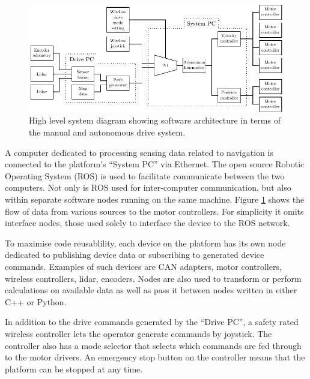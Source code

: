 \documentclass[preprint,authoryear,12pt]{elsarticle}
\begin{document}
    \begin{figure}[htb]
        \centering
        \includegraphics[width=\linewidth]{imgs/system_diagram/software.pdf}
        \caption{High level system diagram showing software architecture in terms of the manual and autonomous drive system.}
        \label{fig:system_diagram_software}
    \end{figure}

    A computer dedicated to processing sensing data related to navigation is connected to the platform's ``System PC'' via Ethernet.
    The open source Robotic Operating System (ROS) is used to facilitate communicate between the two computers.
    Not only is ROS used for inter-computer communication, but also within separate software nodes running on the same machine.
    Figure \ref{fig:system_diagram_software} shows the flow of data from various sources to the motor controllers.
    For simplicity it omits interface nodes, those used solely to interface the device to the ROS network.

    To maximise code reusablility, each device on the platform has its own node dedicated to publishing device data or subscribing to generated device commands.
    Examples of such devices are CAN adapters, motor controllers, wireless controllers, lidar, encoders.
    Nodes are also used to transform or perform calculations on available data as well as pass it between nodes written in either C++ or Python.

    In addition to the drive commands generated by the ``Drive PC'', a safety rated wireless controller lets the operator generate commands by joystick.
    The controller also has a mode selector that selects which commands are fed through to the motor drivers.
    An emergency stop button on the controller means that the platform can be stopped at any time.
\end{document}
